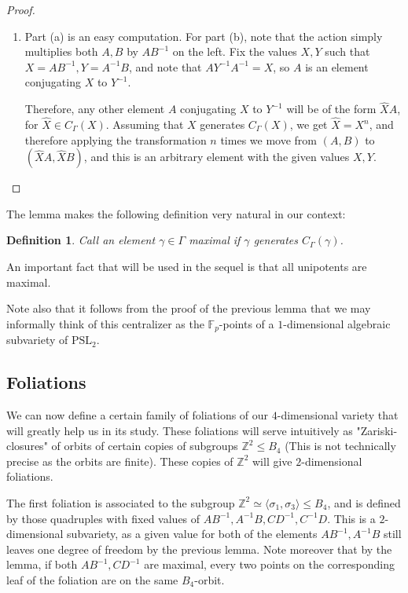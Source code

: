 \documentclass[letterpaper]{amsart}
\newtheorem{definition}[theorem]{Definition}
\begin{document}
\begin{proof}
\begin{enumerate}
    \item Part (a) is an easy computation. For part (b), note that the action simply multiplies both $A,B$ by $AB^{-1}$ on the left. Fix the values $X,Y$ such that $X = AB^{-1},Y = A^{-1}B$, and note that $AY^{-1}A^{-1} = X$, so $A$ is an element conjugating $X$ to $Y^{-1}$.

    Therefore, any other element $A$ conjugating $X$ to $Y^{-1}$ will be of the form $\hat{X} A$, for $\hat{X} \in C_{\Gamma}(X)$. Assuming that $X$ generates $C_\Gamma(X)$, we get $\hat{X} = X^n$, and therefore applying the transformation $n$ times we move from $(A,B)$ to $(\hat{X}A,\hat{X}B)$, and this is an arbitrary element with the given values $X,Y$.
\end{enumerate}
\end{proof}

The lemma makes the following definition very natural in our context:
\begin{definition}
\label{maximal definition}    
Call an element $\gamma \in \Gamma$ maximal if $\gamma$ generates $C_\Gamma(\gamma)$.
\end{definition}
An important fact that will be used in the sequel is that all unipotents are maximal.

Note also that it follows from the proof of the previous lemma that we may informally think of this centralizer as the $\mathbb{F}_p$-points of a $1$-dimensional algebraic subvariety of $\mathrm{PSL}_2$.

\subsection{Foliations}
We can now define a certain family of foliations of our $4$-dimensional variety that will greatly help us in its study.
These foliations will serve intuitively as "Zariski-closures" of orbits of certain copies of subgroups $\mathbb{Z}^2 \leq B_4$ (This is not technically precise as the orbits are finite). These copies of $\mathbb{Z}^2$ will give $2$-dimensional foliations.

The first foliation is associated to the subgroup $\mathbb{Z}^2 \simeq \langle \sigma_1, \sigma_3\rangle \leq B_4$, and is defined by those quadruples with fixed values of $AB^{-1},A^{-1}B,CD^{-1},C^{-1}D$. This is a $2$-dimensional subvariety, as a given value for both of the elements $AB^{-1}, A^{-1}B$ still leaves one degree of freedom by the previous lemma. Note moreover that by the lemma, if both $AB^{-1},CD^{-1}$ are maximal, every two points on the corresponding leaf of the foliation are on the same $B_4$-orbit.
\end{document}
